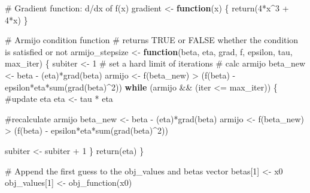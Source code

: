 \documentclass[
  letterpaper,
  DIV=11,
  numbers=noendperiod]{scrartcl}
\newenvironment{Shaded}{\begin{snugshade}}{\end{snugshade}}
\newcommand{\CommentTok}[1]{\textcolor[rgb]{0.37,0.37,0.37}{#1}}
\newcommand{\ControlFlowTok}[1]{\textcolor[rgb]{0.00,0.23,0.31}{\textbf{#1}}}
\newcommand{\DecValTok}[1]{\textcolor[rgb]{0.68,0.00,0.00}{#1}}
\newcommand{\FunctionTok}[1]{\textcolor[rgb]{0.28,0.35,0.67}{#1}}
\newcommand{\NormalTok}[1]{\textcolor[rgb]{0.00,0.23,0.31}{#1}}
\newcommand{\OtherTok}[1]{\textcolor[rgb]{0.00,0.23,0.31}{#1}}
\newcommand{\SpecialCharTok}[1]{\textcolor[rgb]{0.37,0.37,0.37}{#1}}
\begin{document}
\begin{Shaded}
\begin{Highlighting}[]
  \CommentTok{\# Gradient function: d/dx of f(x)}
\NormalTok{  gradient }\OtherTok{\textless{}{-}} \ControlFlowTok{function}\NormalTok{(x) \{}
    \FunctionTok{return}\NormalTok{(}\DecValTok{4}\SpecialCharTok{*}\NormalTok{x}\SpecialCharTok{\^{}}\DecValTok{3} \SpecialCharTok{+} \DecValTok{4}\SpecialCharTok{*}\NormalTok{x)}
\NormalTok{  \}}
  
  \CommentTok{\# Armijo condition function}
  \CommentTok{\# returns TRUE or FALSE whether the condition is satisfied or not}
\NormalTok{  armijo\_stepsize }\OtherTok{\textless{}{-}} \ControlFlowTok{function}\NormalTok{(beta, eta, grad, f, epsilon, tau, max\_iter) \{}
\NormalTok{    subiter }\OtherTok{\textless{}{-}} \DecValTok{1} \CommentTok{\# set a hard limit of iterations}
    \CommentTok{\# calc armijo}
\NormalTok{    beta\_new }\OtherTok{\textless{}{-}}\NormalTok{ beta }\SpecialCharTok{{-}}\NormalTok{ (eta)}\SpecialCharTok{*}\FunctionTok{grad}\NormalTok{(beta)}
\NormalTok{    armijo }\OtherTok{\textless{}{-}} \FunctionTok{f}\NormalTok{(beta\_new) }\SpecialCharTok{\textgreater{}}\NormalTok{ (}\FunctionTok{f}\NormalTok{(beta) }\SpecialCharTok{{-}}\NormalTok{ epsilon}\SpecialCharTok{*}\NormalTok{eta}\SpecialCharTok{*}\FunctionTok{sum}\NormalTok{(}\FunctionTok{grad}\NormalTok{(beta)}\SpecialCharTok{\^{}}\DecValTok{2}\NormalTok{))}
    \ControlFlowTok{while}\NormalTok{ (armijo }\SpecialCharTok{\&\&}\NormalTok{ (iter }\SpecialCharTok{\textless{}=}\NormalTok{ max\_iter)) \{}
      \CommentTok{\#update eta}
\NormalTok{      eta }\OtherTok{\textless{}{-}}\NormalTok{ tau }\SpecialCharTok{*}\NormalTok{ eta}
      
      \CommentTok{\#recalculate armijo}
\NormalTok{      beta\_new }\OtherTok{\textless{}{-}}\NormalTok{ beta }\SpecialCharTok{{-}}\NormalTok{ (eta)}\SpecialCharTok{*}\FunctionTok{grad}\NormalTok{(beta)}
\NormalTok{      armijo }\OtherTok{\textless{}{-}} \FunctionTok{f}\NormalTok{(beta\_new) }\SpecialCharTok{\textgreater{}}\NormalTok{ (}\FunctionTok{f}\NormalTok{(beta) }\SpecialCharTok{{-}}\NormalTok{ epsilon}\SpecialCharTok{*}\NormalTok{eta}\SpecialCharTok{*}\FunctionTok{sum}\NormalTok{(}\FunctionTok{grad}\NormalTok{(beta)}\SpecialCharTok{\^{}}\DecValTok{2}\NormalTok{))}
      
\NormalTok{      subiter }\OtherTok{\textless{}{-}}\NormalTok{ subiter }\SpecialCharTok{+} \DecValTok{1}
\NormalTok{    \}}
    \FunctionTok{return}\NormalTok{(eta)}
\NormalTok{  \}}
  
  \CommentTok{\# Append the first guess to the obj\_values and betas vector}
\NormalTok{  betas[}\DecValTok{1}\NormalTok{] }\OtherTok{\textless{}{-}}\NormalTok{ x0}
\NormalTok{  obj\_values[}\DecValTok{1}\NormalTok{] }\OtherTok{\textless{}{-}} \FunctionTok{obj\_function}\NormalTok{(x0)}
  

\end{Highlighting}
\end{Shaded}
\end{document}
